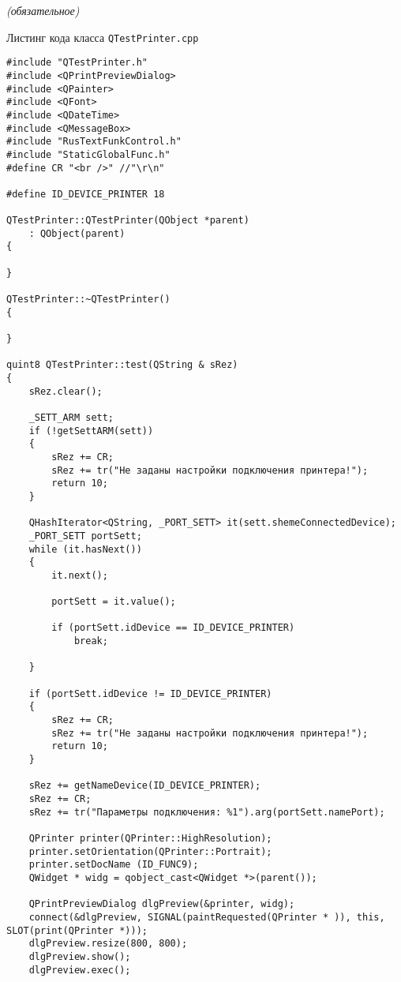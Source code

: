 \label{sec:appendix_c}


\begin{center}
	\normalfont\normalsize{\textit{(обязательное)}}

	\normalfont\normalsize{Листинг кода класса \texttt{QTestPrinter.cpp}}
\end{center}

\begin{verbatim}
#include "QTestPrinter.h"
#include <QPrintPreviewDialog>
#include <QPainter>
#include <QFont>
#include <QDateTime>
#include <QMessageBox>
#include "RusTextFunkControl.h"
#include "StaticGlobalFunc.h"
#define CR "<br />" //"\r\n"

#define ID_DEVICE_PRINTER 18

QTestPrinter::QTestPrinter(QObject *parent)
	: QObject(parent)
{

}

QTestPrinter::~QTestPrinter()
{

}

quint8 QTestPrinter::test(QString & sRez)
{
	sRez.clear();

	_SETT_ARM sett;
	if (!getSettARM(sett))
	{
		sRez += CR;
		sRez += tr("Не заданы настройки подключения принтера!");
		return 10;
	}

	QHashIterator<QString, _PORT_SETT> it(sett.shemeConnectedDevice);
	_PORT_SETT portSett;
	while (it.hasNext())
	{
		it.next();

		portSett = it.value();

		if (portSett.idDevice == ID_DEVICE_PRINTER)
			break;

	}

	if (portSett.idDevice != ID_DEVICE_PRINTER)
	{
		sRez += CR;
		sRez += tr("Не заданы настройки подключения принтера!");
		return 10;
	}

	sRez += getNameDevice(ID_DEVICE_PRINTER);
	sRez += CR;
	sRez += tr("Параметры подключения: %1").arg(portSett.namePort);

	QPrinter printer(QPrinter::HighResolution);
	printer.setOrientation(QPrinter::Portrait);
	printer.setDocName (ID_FUNC9);
	QWidget * widg = qobject_cast<QWidget *>(parent());

	QPrintPreviewDialog dlgPreview(&printer, widg);
	connect(&dlgPreview, SIGNAL(paintRequested(QPrinter * )), this, SLOT(print(QPrinter *)));
	dlgPreview.resize(800, 800);
	dlgPreview.show();
	dlgPreview.exec();


\end{verbatim}

